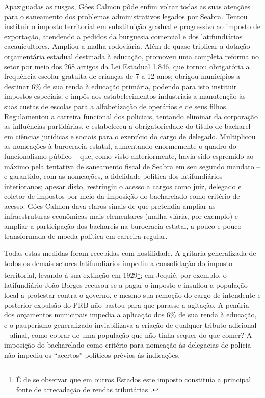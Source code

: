 Apaziguadas as rusgas, Góes Calmon pôde enfim voltar todas as suas atenções para o saneamento dos problemas administrativos legados por Seabra. Tentou instituir o imposto territorial em substituição gradual e progressiva ao imposto de exportação, atendendo a pedidos da burguesia comercial e dos latifundiários cacauicultores. Ampliou a malha rodoviária. Além de quase triplicar a dotação orçamentária estadual destinada à educação, promoveu uma completa reforma no setor por meio dos 268 artigos da Lei Estadual 1.846, que tornou obrigatória a frequência escolar gratuita de crianças de 7 a 12 anos; obrigou municípios a destinar 6\% de sua renda à educação primária, podendo para isto instituir impostos especiais; e impôs aos estabelecimentos industriais a manutenção às suas custas de escolas para a alfabetização de operários e de seus filhos. Regulamentou a carreira funcional dos policiais, tentando eliminar da corporação as influências partidárias, e estabeleceu a obrigatoriedade do título de bacharel em ciências jurídicas e sociais para o exercício do cargo de delegado. Multiplicou as nomeações à burocracia estatal, aumentando enormemente o quadro do funcionalismo público -- que, como visto anteriormente, havia sido espremido ao máximo pela tentativa de saneamento fiscal de Seabra em seu segundo mandato -- e garantido, com as nomeações, a fidelidade política dos latifundiários interioranos; apesar disto, restringiu o acesso a cargos como juiz, delegado e coletor de impostos por meio da imposição do bacharelado como critério de acesso. Góes Calmon dava claros sinais de que pretendia ampliar as infraestruturas econômicas mais elementares (malha viária, por exemplo) e ampliar a participação dos bachareis na burocracia estatal, a pouco e pouco transformada de moeda política em carreira regular.

Todas estas medidas foram recebidas com hostilidade. A gritaria generalizada de todos os demais setores latifundiários impediu a consolidação do imposto territorial, levando à sua extinção em 1929\footnote{É de se observar que em outros Estados este imposto constituía a principal fonte de arrecadação de rendas tributárias \cite[p.~160]{sampaio_partidos_1978}.}; em Jequié, por exemplo, o latifundiário João Borges recusou-se a pagar o imposto e insuflou a população local a protestar contra o governo, e mesmo sua remoção do cargo de intendente e posterior expulsão do PRB não bastou para que parasse a agitação. A penúria dos orçamentos municipais impedia a aplicação dos 6\% de sua renda à educação, e o pauperismo generalizado inviabilizava a criação de qualquer tributo adicional -- afinal, como cobrar de uma população que não tinha sequer do que comer? A imposição do bacharelado como critério para nomeação às delegacias de polícia não impediu os ``acertos'' políticos prévios às indicações.

